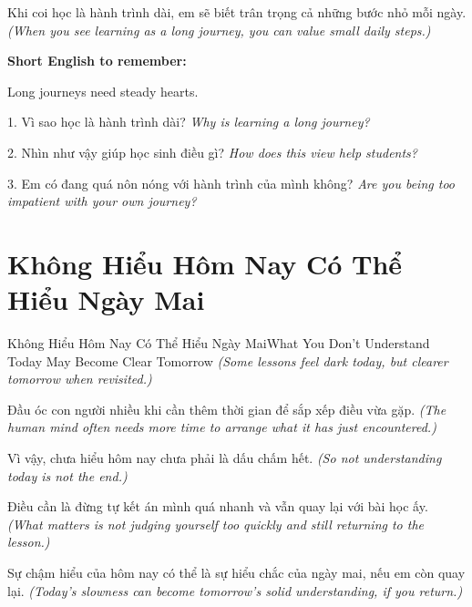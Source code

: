 \begin{baihoc}
Khi coi học là hành trình dài, em sẽ biết trân trọng cả những bước nhỏ mỗi ngày.
\textit{(When you see learning as a long journey, you can value small daily steps.)}
\end{baihoc}

\begin{ghinhoanh}
\textbf{Short English to remember:}

Long journeys need steady hearts.

\end{ghinhoanh}

\begin{tuhocnhanh}
1. Vì sao học là hành trình dài? \textit{Why is learning a long journey?}

2. Nhìn như vậy giúp học sinh điều gì? \textit{How does this view help students?}

3. Em có đang quá nôn nóng với hành trình của mình không? \textit{Are you being too impatient with your own journey?}
\end{tuhocnhanh}
\ngancach

\section{Không Hiểu Hôm Nay Có Thể Hiểu Ngày Mai}
\begin{truyen}{Không Hiểu Hôm Nay Có Thể Hiểu Ngày Mai}{What You Don't Understand Today May Become Clear Tomorrow}
\textit{(Some lessons feel dark today, but clearer tomorrow when revisited.)}

Đầu óc con người nhiều khi cần thêm thời gian để sắp xếp điều vừa gặp.
\textit{(The human mind often needs more time to arrange what it has just encountered.)}

Vì vậy, chưa hiểu hôm nay chưa phải là dấu chấm hết.
\textit{(So not understanding today is not the end.)}

Điều cần là đừng tự kết án mình quá nhanh và vẫn quay lại với bài học ấy.
\textit{(What matters is not judging yourself too quickly and still returning to the lesson.)}
\end{truyen}

\begin{baihoc}
Sự chậm hiểu của hôm nay có thể là sự hiểu chắc của ngày mai, nếu em còn quay lại.
\textit{(Today's slowness can become tomorrow's solid understanding, if you return.)}
\end{baihoc}

